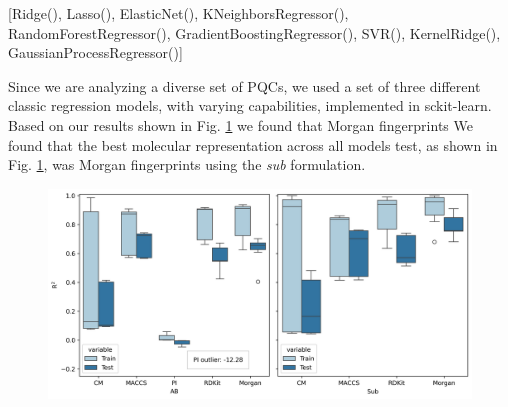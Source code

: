 \documentclass[journal=jacsat,manuscript=article]{achemso}
\begin{document}
[Ridge(), Lasso(), ElasticNet(), KNeighborsRegressor(), RandomForestRegressor(), GradientBoostingRegressor(), SVR(), KernelRidge(), GaussianProcessRegressor()]

Since we are analyzing a diverse set of PQCs, we used a set of three different classic regression models, with varying capabilities, implemented in sckit-learn.\cite{pedregosa_scikit-learn_2011}
Based on our results shown in Fig. \ref{fig:classical_molrepfig} we found that Morgan fingerprints
We found that the best molecular representation across all models test, as shown in Fig. \ref{fig:classical_molrepfig}, was Morgan fingerprints using the \textit{sub} formulation.
 
\begin{figure}[H]
	\centering	
	\includegraphics[width=\linewidth]{../images/BSE/classical/classical_molrepfig.png}
	\caption{}
	\label{fig:classical_molrepfig}
\end{figure}
\end{document}
